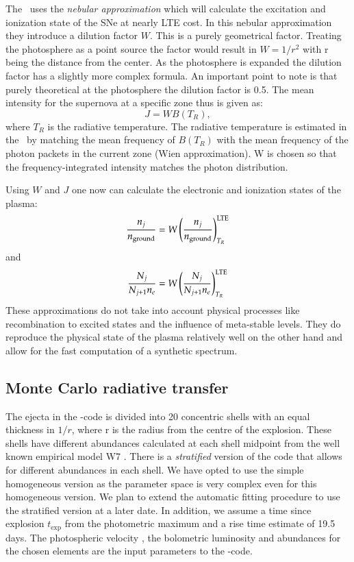 The \mlc\ uses the \textit{nebular approximation} which will calculate the excitation and ionization state of the SNe at nearly LTE cost. In this nebular approximation they introduce a dilution factor $W$. This is a purely geometrical factor. Treating the photosphere as a point source the factor would result in $W=1/r^2$ with r being the distance from the center. As the photosphere is expanded the dilution factor has a slightly more complex formula. An important point to note is that purely theoretical at the photosphere the dilution factor is 0.5.
The mean intensity for the supernova at a specific zone thus is given as:
\[
J = W B(T_R),
\]
where $T_R$ is the radiative temperature. The radiative temperature is estimated in the \mlc\ by matching the mean frequency of $B(T_R)$ with the mean frequency of the photon packets in the current zone (Wien approximation). W is chosen so that the frequency-integrated intensity matches the photon distribution. 

Using $W$ and $J$ one now can calculate the electronic and ionization states of the plasma:
\[
\frac{n_j}{n_{\rm ground}} = W \left( \frac{n_j}{n_{\rm ground}} \right) _{T_R}^{\rm LTE}
\]
and 
\[
\frac{N_j}{N_{j+1}n_e} = W \left( \frac{N_j}{N_{j+1}n_e} \right) _{T_R}^{\rm LTE}
\]
These approximations do not take into account physical processes like recombination to excited states and the influence of meta-stable levels. They do reproduce the physical state of the plasma relatively well on the other hand and allow for the fast computation of a synthetic spectrum.


\subsection{Monte Carlo radiative transfer}

The ejecta in the \mlc-code is divided into 20 concentric shells with an equal thickness in $1/r$, where r is the radius from the centre of the explosion. These shells have different abundances calculated at each shell midpoint from the well known empirical model W7 \citep{1984ApJ...286..644N}. There is a \textit{stratified} version of the code that allows for different abundances in each shell. We have opted to use the simple homogeneous version as the parameter space is very complex even for this homogeneous version. We plan to extend the automatic fitting procedure to use the stratified version at a later date. In addition, we assume a time since explosion $t_\textrm{exp}$ from the photometric maximum and a rise time estimate of 19.5 days. The photospheric velocity \vph, the bolometric luminosity \lbol and abundances for the chosen elements are the input parameters to the \mlc-code. 

